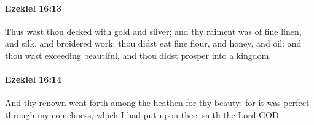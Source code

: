 		\paragraph{Ezekiel 16:13} %
			\label{EZEKIEL-16-13}

			Thus wast thou decked with gold and silver; and thy raiment was of fine linen, and silk, and broidered work; thou didst eat fine flour, and honey, and oil: and thou wast exceeding beautiful, and thou didst prosper into a kingdom.


		\paragraph{Ezekiel 16:14} %
			\label{EZEKIEL-16-14}

			And thy renown went forth among the heathen for thy beauty: for it was perfect through my comeliness, which I had put upon thee, saith the Lord GOD.


